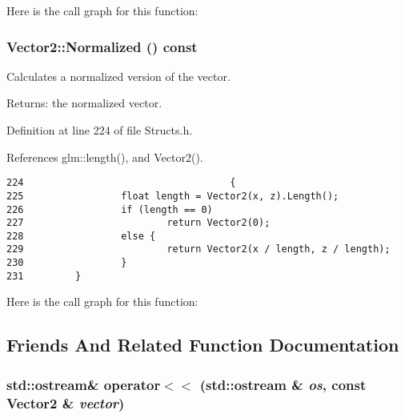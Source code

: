 Here is the call graph for this function:\hypertarget{struct_vector2_34d1ee65e90865a7078dbc7e80e3c7e8}{
\subsubsection[Normalized]{ Vector2::Normalized () const}}
\label{struct_vector2_34d1ee65e90865a7078dbc7e80e3c7e8}


Calculates a normalized version of the vector. 

\begin{Desc}
\item[Returns:]the normalized vector. \end{Desc}


Definition at line 224 of file Structs.h.

References glm::length(), and Vector2().

\begin{Code}\begin{verbatim}224                                    {
225                 float length = Vector2(x, z).Length();
226                 if (length == 0)
227                         return Vector2(0);
228                 else {
229                         return Vector2(x / length, z / length);
230                 }
231         }
\end{verbatim}
\end{Code}




Here is the call graph for this function:

\subsection{Friends And Related Function Documentation}
\hypertarget{struct_vector2_9fc2efab2b5d63c84f76fa8f036bec0c}{
\subsubsection[operator$<$$<$]{\setlength{\rightskip}{0pt plus 5cm}std::ostream\& operator$<$$<$ (std::ostream \& {\em os}, \/  const {\bf Vector2} \& {\em vector})}}
\label{struct_vector2_9fc2efab2b5d63c84f76fa8f036bec0c}


